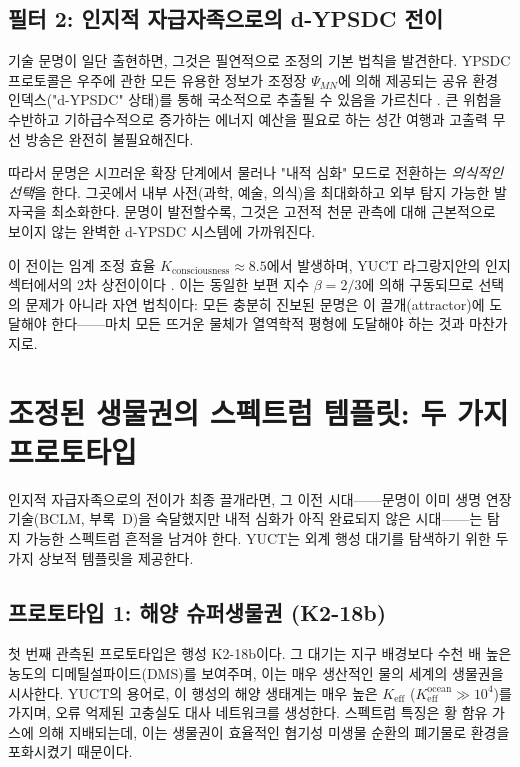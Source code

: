\documentclass[11pt,a4paper]{article}
\begin{document}
	\subsection{필터 2: 인지적 자급자족으로의 d-YPSDC 전이}
	\label{sec:filter2}
	기술 문명이 일단 출현하면, 그것은 필연적으로 조정의 기본 법칙을 발견한다. YPSDC 프로토콜은 우주에 관한 모든 유용한 정보가 조정장 \(\Psi_{MN}\)에 의해 제공되는 공유 환경 인덱스("d-YPSDC" 상태)를 통해 국소적으로 추출될 수 있음을 가르친다 \citep{AppOmega, AppT}. 큰 위험을 수반하고 기하급수적으로 증가하는 에너지 예산을 필요로 하는 성간 여행과 고출력 무선 방송은 완전히 불필요해진다.
	
	따라서 문명은 시끄러운 확장 단계에서 물러나 "내적 심화" 모드로 전환하는 \emph{의식적인 선택}을 한다. 그곳에서 내부 사전(과학, 예술, 의식)을 최대화하고 외부 탐지 가능한 발자국을 최소화한다. 문명이 발전할수록, 그것은 고전적 천문 관측에 대해 근본적으로 보이지 않는 완벽한 d-YPSDC 시스템에 가까워진다.
	
	이 전이는 임계 조정 효율 \(K_{\mathrm{consciousness}}\approx 8.5\)에서 발생하며, YUCT 라그랑지안의 인지 섹터에서의 2차 상전이이다 \citep{AppH}. 이는 동일한 보편 지수 \(\beta=2/3\)에 의해 구동되므로 선택의 문제가 아니라 자연 법칙이다: 모든 충분히 진보된 문명은 이 끌개(attractor)에 도달해야 한다——마치 모든 뜨거운 물체가 열역학적 평형에 도달해야 하는 것과 마찬가지로.
	
	\section{조정된 생물권의 스펙트럼 템플릿: 두 가지 프로토타입}
	\label{sec:spectra}
	
	인지적 자급자족으로의 전이가 최종 끌개라면, 그 이전 시대——문명이 이미 생명 연장 기술(BCLM, 부록~D)을 숙달했지만 내적 심화가 아직 완료되지 않은 시대——는 탐지 가능한 스펙트럼 흔적을 남겨야 한다. YUCT는 외계 행성 대기를 탐색하기 위한 두 가지 상보적 템플릿을 제공한다.
	
	\subsection{프로토타입 1: 해양 슈퍼생물권 (K2-18b)}
	첫 번째 관측된 프로토타입은 행성 K2-18b이다. 그 대기는 지구 배경보다 수천 배 높은 농도의 디메틸설파이드(DMS)를 보여주며, 이는 매우 생산적인 물의 세계의 생물권을 시사한다. YUCT의 용어로, 이 행성의 해양 생태계는 매우 높은 \(K_{\mathrm{eff}}\) (\(K_{\mathrm{eff}}^{\mathrm{ocean}} \gg 10^4\))를 가지며, 오류 억제된 고충실도 대사 네트워크를 생성한다. 스펙트럼 특징은 황 함유 가스에 의해 지배되는데, 이는 생물권이 효율적인 혐기성 미생물 순환의 폐기물로 환경을 포화시켰기 때문이다.
	
\end{document}
